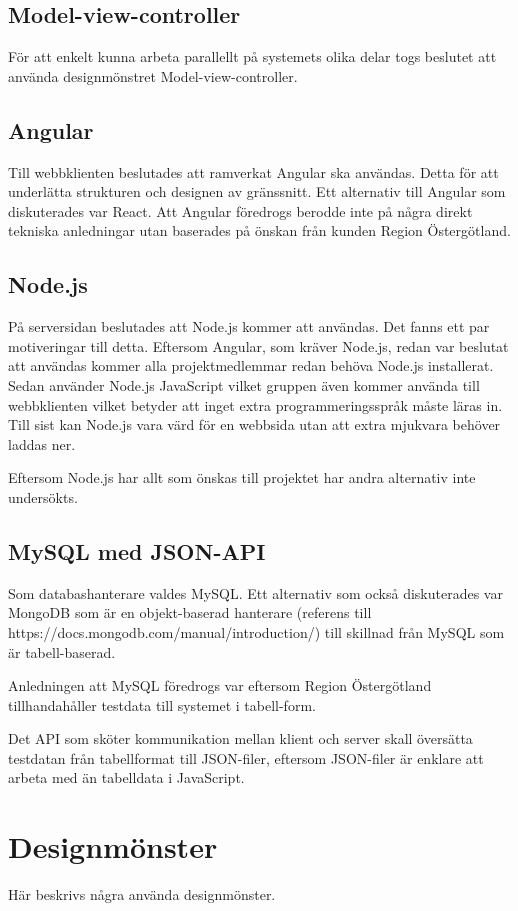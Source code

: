 \documentclass[a4paper,10pt]{article}
\begin{document}
\subsection{Model-view-controller}
För att enkelt kunna arbeta parallellt på systemets olika delar togs beslutet att använda designmönstret Model-view-controller.

\subsection{Angular}
Till webbklienten beslutades att ramverkat Angular ska användas. Detta för att underlätta strukturen och designen av gränssnitt.
Ett alternativ till Angular som diskuterades var React. Att Angular föredrogs berodde inte på några direkt tekniska anledningar utan baserades på önskan från kunden Region Östergötland.

\subsection{Node.js}
På serversidan beslutades att Node.js kommer att användas. Det fanns ett par motiveringar till detta. Eftersom Angular, som kräver Node.js, redan var beslutat att användas kommer alla projektmedlemmar redan behöva Node.js installerat. Sedan använder Node.js JavaScript vilket gruppen även kommer använda till webbklienten vilket betyder att inget extra programmeringsspråk måste läras in. Till sist kan Node.js vara värd för en webbsida utan att extra mjukvara behöver laddas ner.

Eftersom Node.js har allt som önskas till projektet har andra alternativ inte undersökts.

\subsection{MySQL med JSON-API}
Som databashanterare valdes MySQL. Ett alternativ som också diskuterades var MongoDB som är en objekt-baserad hanterare (referens till https://docs.mongodb.com/manual/introduction/) till skillnad från MySQL som är tabell-baserad.

Anledningen att MySQL föredrogs var eftersom Region Östergötland tillhandahåller testdata till systemet i tabell-form.

Det API som sköter kommunikation mellan klient och server skall översätta testdatan från tabellformat till JSON-filer, eftersom JSON-filer är enklare att arbeta med än tabelldata i JavaScript.

\section{Designmönster}
Här beskrivs några använda designmönster.
\end{document}
